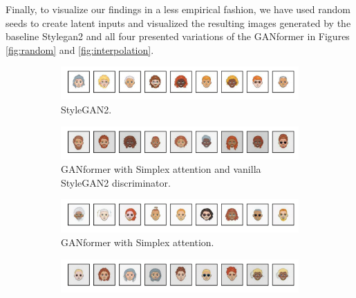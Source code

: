 \documentclass{article}
\begin{document}
	Finally, to visualize our findings in a less empirical fashion, we have used random 
	seeds to create latent inputs and visualized the resulting images generated by the baseline 
	Stylegan2 and all four presented variations of the GANformer in Figures \ref{fig:random} and 
	\ref{fig:interpolation}.
	\begin{figure}[htpb]
		\centering
		\begin{subfigure}{\linewidth}
			\includegraphics[width=\linewidth]{../src/trained_network/out_imgs/random_Stylegan2_300kimg.png}
			\vspace{-7mm}
			\caption{StyleGAN2.} 
		\end{subfigure}
		\begin{subfigure}{\linewidth}
			\includegraphics[width=\linewidth]{../src/trained_network/out_imgs/random_GANFormer_Simplex_D_Stylegan2_300kimg.png}
			\vspace{-7mm}
			\caption{GANformer with Simplex attention and vanilla StyleGAN2 discriminator.}
		\end{subfigure}
			\begin{subfigure}{\linewidth}
			\includegraphics[width=\linewidth]{../src/trained_network/out_imgs/random_GANFormer_Simplex_D_Att_300kimg.png}
			\vspace{-7mm}
			\caption{GANformer with Simplex attention.}
		\end{subfigure}
		\begin{subfigure}{\linewidth}
			\includegraphics[width=\linewidth]{../src/trained_network/out_imgs/random_GANFormer_Duplex_D_Stylegan2_300kimg.png}
			\vspace{-7mm}

\end{subfigure}
\end{figure}
\end{document}
